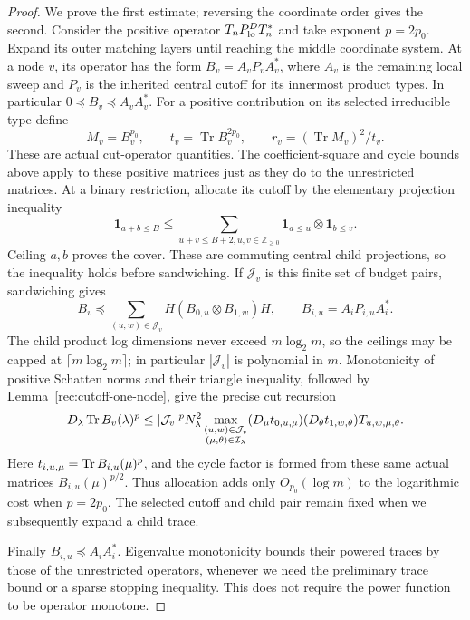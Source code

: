 \begin{proof}
We prove the first estimate; reversing the coordinate order gives the
second.  Consider the positive operator $T_nP_{\rm lo}^DT_n^*$ and take
exponent $p=2p_0$.  Expand its outer matching layers until reaching
the middle coordinate system.  At a node $v$, its operator has the
form $B_v=A_vP_vA_v^*$, where $A_v$ is the remaining local sweep
and $P_v$ is the inherited central cutoff for its innermost product
types.  In particular $0\preceq B_v\preceq A_vA_v^*$.
For a positive contribution on its selected irreducible type define
\[
 M_v=B_v^{p_0},\qquad t_v=\operatorname{Tr}B_v^{2p_0},\qquad
 r_v=(\operatorname{Tr}M_v)^2/t_v.
\]
These are actual cut-operator quantities.  The coefficient-square and
cycle bounds above apply to these positive matrices just as they do to
the unrestricted matrices.
At a binary restriction, allocate its cutoff by the elementary
projection inequality
\begin{equation}\label{rec:cutoff-allocation}
 \mathbf1_{a+b\le B}\le
 \sum_{u+v\le B+2, u,v\in\mathbb Z_{\ge 0}}
          \mathbf1_{a\le u}\otimes\mathbf1_{b\le v}.
\end{equation}
Ceiling $a,b$ proves the cover.  These are commuting central child
projections, so the inequality holds before sandwiching.  If
$\mathcal J_v$ is this finite set of budget pairs, sandwiching gives
\[
 B_v\preceq\sum_{(u,w)\in\mathcal J_v}
 H(B_{0,u}\otimes B_{1,w})H,\qquad
 B_{i,u}=A_iP_{i,u}A_i^*.
\]
The child product log dimensions never exceed $m\log_2m$, so the
ceilings may be capped at $\lceil m\log_2m\rceil$; in particular
$|\mathcal J_v|$ is polynomial in $m$.  Monotonicity of positive
Schatten norms and their triangle inequality, followed by
Lemma~\ref{rec:cutoff-one-node}, give the precise cut recursion
\begin{equation}\label{rec:cutoff-cut-node}
 D_\lambda\operatorname{Tr} B_v(\lambda)^p
 \le |\mathcal J_v|^p N_\lambda^2
 \max_{\substack{(u,w)\in\mathcal J_v\\
                  (\mu,\theta)\in\mathcal I_\lambda}}
      (D_\mu t_{0,u,\mu})(D_\theta t_{1,w,\theta})
                  T_{u,w,\mu,\theta}.
\end{equation}
Here $t_{i,u,\mu}=\operatorname{Tr} B_{i,u}(\mu)^p$, and the cycle factor is
formed from these same actual matrices $B_{i,u}(\mu)^{p/2}$.
Thus allocation adds only $O_{p_0}(\log m)$ to the logarithmic cost
when $p=2p_0$.  The selected cutoff and child pair remain fixed when
we subsequently expand a child trace.

Finally $B_{i,u}\preceq A_iA_i^*$.  Eigenvalue monotonicity bounds
their powered traces by those of the unrestricted operators, whenever
we need the preliminary trace bound or a sparse stopping inequality.
This does not require the power function to be operator monotone.


\end{proof}

